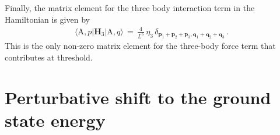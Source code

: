 \documentclass[12pt,prd,tightenlines,nofootinbib]{revtex4-2}
\begin{document}
Finally, the matrix element for the three body interaction term in the Hamiltonian
is given by
\begin{align}
  \langle\text{A},p| \textbf{H}_{3} | \text{A},q \rangle\, =\,
  \frac{4}{L^{6}}\,\eta_{3}\,\delta_{\textbf{p}_{1}+\textbf{p}_{2}+\textbf{p}_{3},\textbf{q}_{1}+\textbf{q}_{2}+\textbf{q}_{3}}\,.
\end{align}
This is the only non-zero matrix element for the three-body force term that contributes at threshold. 

\section{Perturbative shift to the ground state energy}
\label{sec:final}
\end{document}
